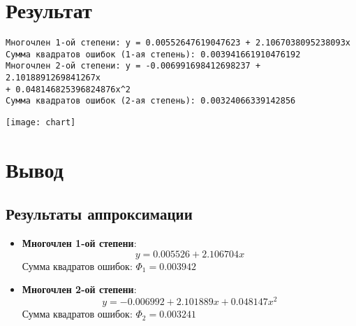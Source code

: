 \section*{Результат}

\begin{verbatim}
Многочлен 1-ой степени: y = 0.00552647619047623 + 2.1067038095238093x
Сумма квадратов ошибок (1-ая степень): 0.003941661910476192
Многочлен 2-ой степени: y = -0.006991698412698237 + 2.1018891269841267x 
+ 0.048146825396824876x^2
Сумма квадратов ошибок (2-ая степень): 0.00324066339142856
\end{verbatim}

\texttt{[image: chart]}

\section*{Вывод}

\subsection*{Результаты аппроксимации}
\begin{itemize}
\item \textbf{Многочлен 1-ой степени}:
\[ y = 0.005526 + 2.106704x \]
Сумма квадратов ошибок: $\Phi_1 = 0.003942$

\item \textbf{Многочлен 2-ой степени}:
\[ y = -0.006992 + 2.101889x + 0.048147x^2 \]
Сумма квадратов ошибок: $\Phi_2 = 0.003241$
\end{itemize}


